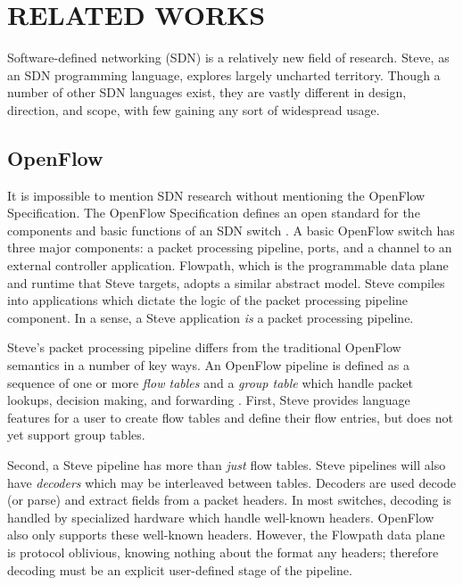 \chapter{RELATED WORKS} \label{ch:related}

Software-defined networking (SDN) is a relatively new field of research. Steve, as an SDN programming language, explores largely uncharted territory. Though a number of other SDN languages exist, they are vastly different in design, direction, and scope, with few gaining any sort of widespread usage.

\section{OpenFlow} \label{rel:openflow}

It is impossible to mention SDN research without mentioning the OpenFlow Specification. The OpenFlow Specification defines an open standard for the components and basic functions of an SDN switch \cite{openflow_spec}.
A basic OpenFlow switch has three major components: a packet processing pipeline, ports, and a channel to an external controller application. Flowpath, which is the programmable data plane and runtime that Steve targets, adopts a similar abstract model. Steve compiles into applications which dictate the logic of the packet processing pipeline component. In a sense, a Steve application \textit{is} a packet processing pipeline.

Steve's packet processing pipeline differs from the traditional OpenFlow semantics in a number of key ways. An OpenFlow pipeline is defined as a sequence of one or more \textit{flow tables} and a \textit{group table} which handle packet lookups, decision making, and forwarding \cite{openflow_spec}. First, Steve provides language features for a user to create flow tables and define their flow entries, but does not yet support group tables. 

Second, a Steve pipeline has more than \textit{just} flow tables. Steve pipelines will also have \textit{decoders} which may be interleaved between tables. Decoders are used decode (or parse) and extract fields from a packet headers. In most switches, decoding is handled by specialized hardware which handle well-known headers. OpenFlow also only supports these well-known headers. However, the Flowpath data plane is protocol oblivious, knowing nothing about the format any headers; therefore decoding must be an explicit user-defined stage of the pipeline.

